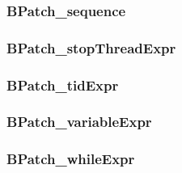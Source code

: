 \subsubsection{BPatch\_sequence}


\subsubsection{BPatch\_stopThreadExpr}


\subsubsection{BPatch\_tidExpr}


\subsubsection{BPatch\_variableExpr}


\subsubsection{BPatch\_whileExpr}

